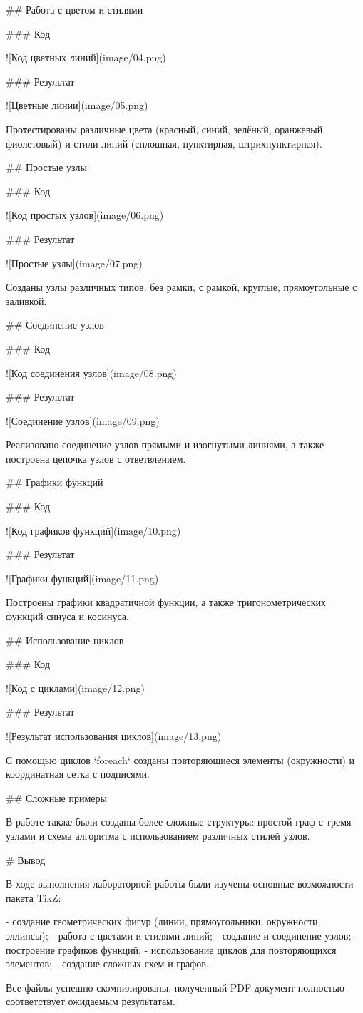 ## Работа с цветом и стилями

### Код

![Код цветных линий](image/04.png)

### Результат

![Цветные линии](image/05.png)

Протестированы различные цвета (красный, синий, зелёный, оранжевый, фиолетовый) и стили линий (сплошная, пунктирная, штрихпунктирная).

## Простые узлы

### Код

![Код простых узлов](image/06.png)

### Результат

![Простые узлы](image/07.png)

Созданы узлы различных типов: без рамки, с рамкой, круглые, прямоугольные с заливкой.

## Соединение узлов

### Код

![Код соединения узлов](image/08.png)

### Результат

![Соединение узлов](image/09.png)

Реализовано соединение узлов прямыми и изогнутыми линиями, а также построена цепочка узлов с ответвлением.

## Графики функций

### Код

![Код графиков функций](image/10.png)

### Результат

![Графики функций](image/11.png)

Построены графики квадратичной функции, а также тригонометрических функций синуса и косинуса.

## Использование циклов

### Код

![Код с циклами](image/12.png)

### Результат

![Результат использования циклов](image/13.png)

С помощью циклов `foreach` созданы повторяющиеся элементы (окружности) и координатная сетка с подписями.

## Сложные примеры

В работе также были созданы более сложные структуры: простой граф с тремя узлами и схема алгоритма с использованием различных стилей узлов.

# Вывод

В ходе выполнения лабораторной работы были изучены основные возможности пакета TikZ:

- создание геометрических фигур (линии, прямоугольники, окружности, эллипсы);
- работа с цветами и стилями линий;
- создание и соединение узлов;
- построение графиков функций;
- использование циклов для повторяющихся элементов;
- создание сложных схем и графов.

Все файлы успешно скомпилированы, полученный PDF-документ полностью соответствует ожидаемым результатам.